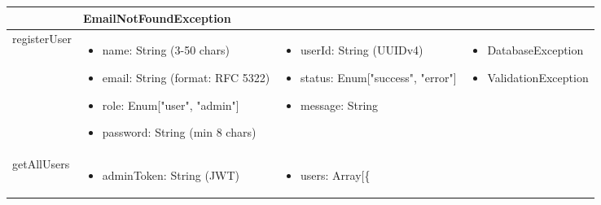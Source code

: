 \documentclass[12pt, titlepage]{article}
\begin{document}
\begin{center}
\begin{tabular}{p{2cm} p{4cm} p{2cm} p{4cm}}
\begin{minipage}{3.5cm}
\begin{itemize}[leftmargin=*,noitemsep]
  \end{itemize}
  \end{minipage} & 
  EmailNotFoundException \\
  \hline
  registerUser & 
  \begin{minipage}{3.5cm}
  \vspace{-0.2cm}
  \begin{itemize}[leftmargin=*,noitemsep]
    \item name: String (3-50 chars)
    \item email: String (format: RFC 5322)
    \item role: Enum["user", "admin"]
    \item password: String (min 8 chars)
  \end{itemize}
  \end{minipage} & 
  \begin{minipage}{3.5cm}
  \vspace{-0.2cm}
  \begin{itemize}[leftmargin=*,noitemsep]
    \item userId: String (UUIDv4)
    \item status: Enum["success", "error"]
    \item message: String
  \end{itemize}
  \end{minipage} & 
  \begin{minipage}{3.5cm}
  \vspace{-0.2cm}
  \begin{itemize}[leftmargin=*,noitemsep]
    \item DatabaseException
    \item ValidationException
  \end{itemize}
  \end{minipage} \\
  \hline
  getAllUsers & 
  \begin{minipage}{3.5cm}
  \vspace{-0.2cm}
  \begin{itemize}[leftmargin=*,noitemsep]
    \item adminToken: String (JWT)
  \end{itemize}
  \end{minipage} & 
  \begin{minipage}{3.5cm}
  \vspace{-0.2cm}
  \begin{itemize}[leftmargin=*,noitemsep]
    \item users: Array[\{
      \begin{itemize}[leftmargin=*,noitemsep]

\end{itemize}
\end{itemize}
\end{minipage}
\end{tabular}
\end{center}
\end{document}
